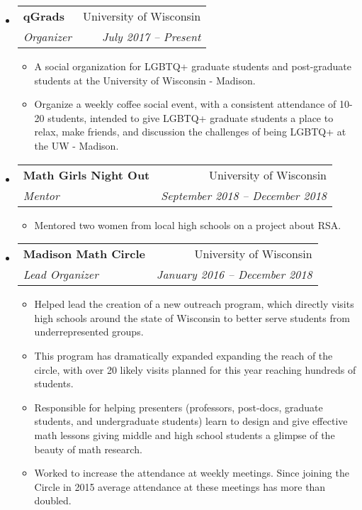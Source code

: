 \documentclass[letterpaper,11pt]{article}
\makeatletter
\newcommand{\ressubheading}[4]{
\begin{tabular*}{6.5in}[t]{l@{\cftdotfill{\cftsecdotsep}\extracolsep{\fill}}r}
		\textbf{#1} & #2 \\
		\textit{#3} & \textit{#4} \\
\end{tabular*}\vspace{-6pt}}
\makeatother
\begin{document}
\begin{itemize}

	
\item 
	\ressubheading{qGrads}{University of Wisconsin}{Organizer}{July 2017 -- Present}
	\begin{itemize}
		\item A social organization for LGBTQ+ graduate students and post-graduate students at the University of Wisconsin - Madison.
		\item Organize a weekly coffee social event, with a consistent attendance of 10-20 students, intended to give LGBTQ+ graduate students a place to relax, make friends, and discussion the challenges of being LGBTQ+ at the UW - Madison.
	\end{itemize}
		
\item 
	\ressubheading{Math Girls Night Out}{University of Wisconsin}{Mentor}{September 2018 -- December 2018}
	\begin{itemize}
		\item Mentored two women from local high schools on a project about RSA.
	\end{itemize}
		
\item 
	\ressubheading{Madison Math Circle}{University of Wisconsin}{Lead Organizer}{January 2016 -- December 2018}
	\begin{itemize}
		\item Helped lead the creation of a new outreach program, which directly visits high schools around the state of Wisconsin to better serve students from underrepresented groups.
		\item This program has dramatically expanded expanding the reach of the circle, with over 20 likely visits planned for this year reaching hundreds of students.
		\item Responsible for helping presenters (professors, post-docs, graduate students, and undergraduate students) learn to design and give effective math lessons giving middle and high school students a glimpse of the beauty of math research.
		\item Worked to increase the attendance at weekly meetings. Since joining the Circle in 2015 average attendance at these meetings has more than doubled.
	\end{itemize}
	

\end{itemize}
\end{document}
